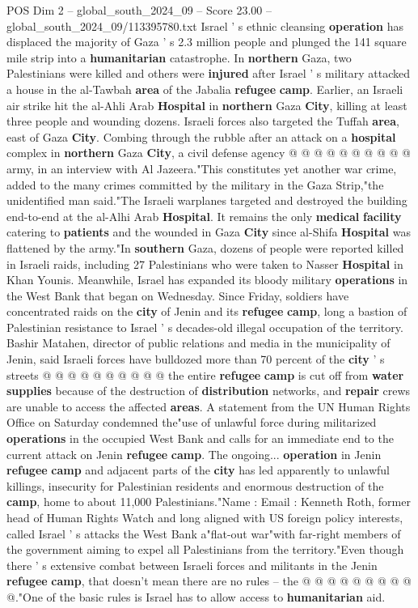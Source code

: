 \begin{textsample}{POS Dim 2 – global\_south\_2024\_09 – Score 23.00 – global\_south\_2024\_09/113395780.txt}
Israel ' s ethnic cleansing \textbf{operation} has displaced the majority of Gaza ' s 2.3 million people and plunged the 141 square mile strip into a \textbf{humanitarian} catastrophe.
In \textbf{northern} Gaza, two Palestinians were killed and others were \textbf{injured} after Israel ' s military attacked a house in the al-Tawbah \textbf{area} of the Jabalia \textbf{refugee} \textbf{camp}.
Earlier, an Israeli air strike hit the al-Ahli Arab \textbf{Hospital} in \textbf{northern} Gaza \textbf{City}, killing at least three people and wounding dozens.
Israeli forces also targeted the Tuffah \textbf{area}, east of Gaza \textbf{City}.
Combing through the rubble after an attack on a \textbf{hospital} complex in \textbf{northern} Gaza \textbf{City}, a civil defense agency @ @ @ @ @ @ @ @ @ @ army, in an interview with Al Jazeera."This constitutes yet another war crime, added to the many crimes committed by the military in the Gaza Strip,"the unidentified man said."The Israeli warplanes targeted and destroyed the building end-to-end at the al-Alhi Arab \textbf{Hospital}.
It remains the only \textbf{medical} \textbf{facility} catering to \textbf{patients} and the wounded in Gaza \textbf{City} since al-Shifa \textbf{Hospital} was flattened by the army."In \textbf{southern} Gaza, dozens of people were reported killed in Israeli raids, including 27 Palestinians who were taken to Nasser \textbf{Hospital} in Khan Younis.
Meanwhile, Israel has expanded its bloody military \textbf{operations} in the West Bank that began on Wednesday.
Since Friday, soldiers have concentrated raids on the \textbf{city} of Jenin and its \textbf{refugee} \textbf{camp}, long a bastion of Palestinian resistance to Israel ' s decades-old illegal occupation of the territory.
Bashir Matahen, director of public relations and media in the municipality of Jenin, said Israeli forces have bulldozed more than 70 percent of the \textbf{city} ' s streets @ @ @ @ @ @ @ @ @ @ the entire \textbf{refugee} \textbf{camp} is cut off from \textbf{water} \textbf{supplies} because of the destruction of \textbf{distribution} networks, and \textbf{repair} crews are unable to access the affected \textbf{areas}.
A statement from the UN Human Rights Office on Saturday condemned the"use of unlawful force during militarized \textbf{operations} in the occupied West Bank and calls for an immediate end to the current attack on Jenin \textbf{refugee} \textbf{camp}.
The ongoing... \textbf{operation} in Jenin \textbf{refugee} \textbf{camp} and adjacent parts of the \textbf{city} has led apparently to unlawful killings, insecurity for Palestinian residents and enormous destruction of the \textbf{camp}, home to about 11,000 Palestinians."Name : Email : Kenneth Roth, former head of Human Rights Watch and long aligned with US foreign policy interests, called Israel ' s attacks the West Bank a"flat-out war"with far-right members of the government aiming to expel all Palestinians from the territory."Even though there ' s extensive combat between Israeli forces and militants in the Jenin \textbf{refugee} \textbf{camp}, that doesn't mean there are no rules -- the @ @ @ @ @ @ @ @ @ @."One of the basic rules is Israel has to allow access to \textbf{humanitarian} aid.

\end{textsample}
